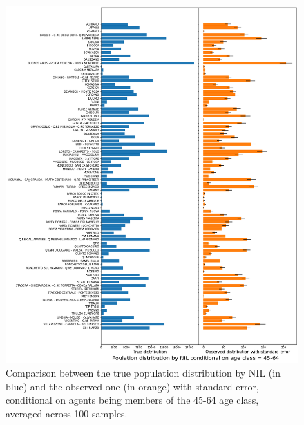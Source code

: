 \begin{figure}[H]
    \centering
    \includegraphics[scale = 0.45]{tex/pics/pop_by_nil_45.png}
    \caption{Comparison between the true population distribution by NIL (in blue) and the observed one (in orange) with standard error, conditional on agents being members of the 45-64 age class, averaged across 100 samples.}
    \label{pop_nil_45}
\end{figure}

